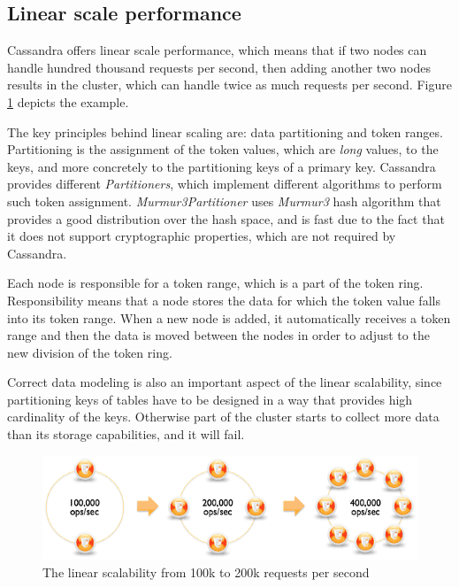
\subsection{Linear scale performance}
\label{sec:theory:cassandra:linear}
Cassandra offers linear scale performance, which means that if two nodes can handle hundred thousand requests per second, then adding another two nodes results in the cluster, which can handle twice as much requests per second. Figure \ref{fig:archLinearScale} depicts the example.

The key principles behind linear scaling are:  data partitioning and token ranges. 
Partitioning is the assignment of the token values, which are \emph{long} values, to the keys, and more concretely to the partitioning keys of a primary key. Cassandra provides different \emph{Partitioners}, which implement different algorithms to perform such token assignment. \emph{Murmur3Partitioner} uses \emph{Murmur3} hash algorithm that provides a good distribution over the hash space, and is fast due to the fact that it does not support cryptographic properties, which are not required by Cassandra.

Each node is responsible for a token range, which is a part of the token ring. Responsibility means that a node stores the data for which the token value falls into its token range. When a new node is added, it automatically receives a token range and then the data is moved between the nodes in order to adjust to the new division of the token ring.

Correct data modeling is also an important aspect of the linear scalability, since partitioning keys of tables have to be designed in a way that provides high cardinality of the keys. Otherwise part of the cluster starts to collect more data than its storage capabilities, and it will fail. 


\begin{figure}[H]
  \centering  
  \includegraphics[width=\textwidth]{images/cassandra-linear-scalability.png}\hspace{10mm}  
  \caption{The linear scalability from 100k to 200k requests per second}
  \label{fig:archLinearScale}
\end{figure}


